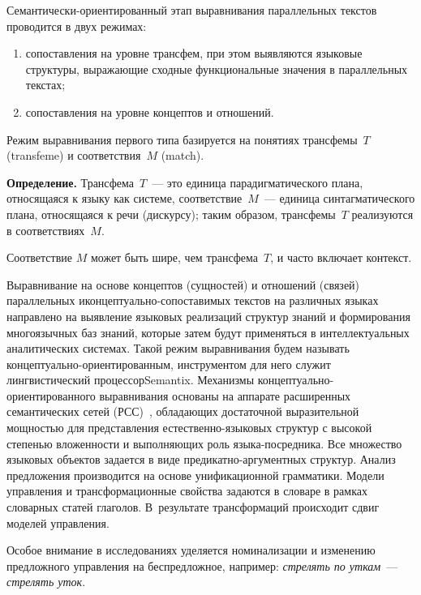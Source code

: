 \begin{multicols}{2}
  Семантически-ориентированный этап выравнивания параллельных текстов 
проводится в двух режимах: 
\begin{enumerate}[(1)]
\item сопоставления на уровне трансфем, при этом 
выявляются языковые структуры, вы\-ра\-жа\-ющие сходные функциональные 
значения в параллельных текстах; 
\item сопоставления на уровне концептов и 
отношений.
\end{enumerate}
  
  Режим выравнивания первого типа базируется на понятиях 
трансфемы~$T$ (transfeme) и соответствия~$M$ (match).
  
  \medskip
  
  \noindent
  \textbf{Определение.} Трансфема~$T$~--- это единица парадигматического 
плана, относящаяся к языку как системе, соответствие~$M$~--- единица 
синтагматического плана, относящаяся к речи (дискурсу); таким образом, 
трансфемы~$T$ реализуются в соответствиях~$M$.
  
  \smallskip
  
  Соответствие $M$ может быть шире, чем трансфема~$T$, и часто 
включает контекст.
  
  Выравнивание на основе концептов (сущ\-ностей) и отношений (связей) 
параллельных и\linebreak кон\-цеп\-ту\-аль\-но-со\-по\-ста\-ви\-мых текстов на 
различных языках направлено на выявление языковых реализаций структур 
знаний и формирования многоязычных баз знаний, которые затем будут 
применяться в интеллектуальных аналитических сис\-те\-мах. Такой режим 
выравнивания будем \mbox{назы\-вать} 
  кон\-цеп\-ту\-аль\-но-ори\-ен\-ти\-ро\-ван\-ным, инструментом для него 
служит лингвистический процессор\linebreak \mbox{Semantix}. Механизмы 
  кон\-цеп\-ту\-аль\-но-ори\-ен\-ти\-ро\-ван\-но\-го выравнивания основаны 
на аппарате расширенных семантических сетей (РСС)~\cite{4-koz}, 
обла\-да\-ющих достаточной выразительной мощностью для представления 
естественно-языковых структур с высокой степенью вложенности и 
выполняющих роль язы\-ка-по\-сред\-ни\-ка. Все множество языковых 
объектов задается в виде пре\-ди\-кат\-но-аргу\-мент\-ных структур. Анализ 
предложения производится на основе унификационной грамматики. Модели 
управления и трансформационные свойства задаются в словаре в рамках 
словарных статей глаголов. В~результате трансформаций происходит сдвиг 
моделей управления.
  
  Особое внимание в исследованиях уделяется номинализации и изменению 
предложного управления на беспредложное, например: \textit{стрелять по 
уткам}~--- \textit{стрелять уток}.
  

\end{multicols}
